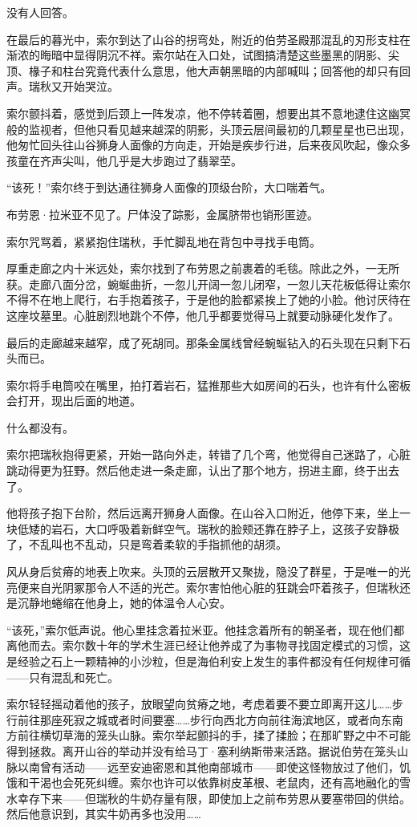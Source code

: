 \documentclass[AutoFakeBold=true]{book}
\begin{document}
没有人回答。

在最后的暮光中，索尔到达了山谷的拐弯处，附近的伯劳圣殿那混乱的刃形支柱在渐浓的晦暗中显得阴沉不祥。索尔站在入口处，试图搞清楚这些墨黑的阴影、尖顶、椽子和柱台究竟代表什么意思，他大声朝黑暗的内部喊叫；回答他的却只有回声。瑞秋又开始哭泣。

索尔颤抖着，感觉到后颈上一阵发凉，他不停转着圈，想要出其不意地逮住这幽冥般的监视者，但他只看见越来越深的阴影，头顶云层间最初的几颗星星也已出现，他匆忙回头往山谷狮身人面像的方向走，开始是疾步行进，后来夜风吹起，像众多孩童在齐声尖叫，他几乎是大步跑过了翡翠茔。

``{\kaishu 该死！}''索尔终于到达通往狮身人面像的顶级台阶，大口喘着气。

布劳恩·拉米亚不见了。尸体没了踪影，金属脐带也销形匿迹。

索尔咒骂着，紧紧抱住瑞秋，手忙脚乱地在背包中寻找手电筒。

厚重走廊之内十米远处，索尔找到了布劳恩之前裹着的毛毯。除此之外，一无所获。走廊八面分岔，蜿蜒曲折，一忽儿开阔一忽儿闭窄，一忽儿天花板低得让索尔不得不在地上爬行，右手抱着孩子，于是他的脸都紧挨上了她的小脸。他讨厌待在这座坟墓里。心脏剧烈地跳个不停，他几乎都要觉得马上就要动脉硬化发作了。

最后的走廊越来越窄，成了死胡同。那条金属线曾经蜿蜒钻入的石头现在只剩下石头而已。

索尔将手电筒咬在嘴里，拍打着岩石，猛推那些大如房间的石头，也许有什么密板会打开，现出后面的地道。

什么都没有。

索尔把瑞秋抱得更紧，开始一路向外走，转错了几个弯，他觉得自己迷路了，心脏跳动得更为狂野。然后他走进一条走廊，认出了那个地方，拐进主廊，终于出去了。

他将孩子抱下台阶，然后远离开狮身人面像。在山谷入口附近，他停下来，坐上一块低矮的岩石，大口呼吸着新鲜空气。瑞秋的脸颊还靠在脖子上，这孩子安静极了，不乱叫也不乱动，只是弯着柔软的手指抓他的胡须。

风从身后贫瘠的地表上吹来。头顶的云层散开又聚拢，隐没了群星，于是唯一的光亮便来自光阴冢那令人不适的光芒。索尔害怕他心脏的狂跳会吓着孩子，但瑞秋还是沉静地蜷缩在他身上，她的体温令人心安。

``该死，''索尔低声说。他心里挂念着拉米亚。他挂念着所有的朝圣者，现在他们都离他而去。索尔数十年的学术生涯已经让他养成了为事物寻找固定模式的习惯，这是经验之石上一颗精神的小沙粒，但是海伯利安上发生的事件都没有任何规律可循——只有混乱和死亡。

索尔轻轻摇动着他的孩子，放眼望向贫瘠之地，考虑着要不要立即离开这儿……步行前往那座死寂之城或者时间要塞……步行向西北方向前往海滨地区，或者向东南方前往横切草海的笼头山脉。索尔举起颤抖的手，揉了揉脸；在那旷野之中不可能得到拯救。离开山谷的举动并没有给马丁·塞利纳斯带来活路。据说伯劳在笼头山脉以南曾有活动——远至安迪密恩和其他南部城市——即使这怪物放过了他们，饥饿和干渴也会死死纠缠。索尔也许可以依靠树皮革根、老鼠肉，还有高地融化的雪水幸存下来——但瑞秋的牛奶存量有限，即使加上之前布劳恩从要塞带回的供给。然后他意识到，其实牛奶再多也没用……
\end{document}
